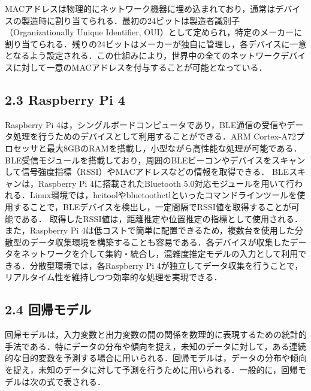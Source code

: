 MACアドレスは物理的にネットワーク機器に埋め込まれており，通常はデバイスの製造時に割り当てられる．最初の24ビットは製造者識別子（Organizationally Unique Identifier, OUI）として定められ，特定のメーカーに割り当てられる．残りの24ビットはメーカーが独自に管理し，各デバイスに一意となるよう設定される．この仕組みにより，世界中の全てのネットワークデバイスに対して一意のMACアドレスを付与することが可能となっている．

\subsection*{2.3 Raspberry Pi 4}
Raspberry Pi 4は，シングルボードコンピュータであり，BLE通信の受信やデータ処理を行うためのデバイスとして利用することができる\cite{rasPi}．ARM Cortex-A72プロセッサと最大8GBのRAMを搭載し，小型ながら高性能な処理が可能である\cite{rasPi}．BLE受信モジュールを搭載しており，周囲のBLEビーコンやデバイスをスキャンして信号強度指標（RSSI）やMACアドレスなどの情報を取得できる\cite{rasPi}．
BLEスキャンは，Raspberry Pi 4に搭載されたBluetooth 5.0対応モジュールを用いて行われる．Linux環境では，hcitoolやbluetoothctlといったコマンドラインツールを使用することで，BLEデバイスを検出し，一定間隔でRSSI値を取得することが可能である．
取得したRSSI値は，距離推定や位置推定の指標として使用される．
また，Raspberry Pi 4は低コストで簡単に配置できるため，複数台を使用した分散型のデータ収集環境を構築することも容易である．各デバイスが収集したデータをネットワークを介して集約・統合し，混雑度推定モデルの入力として利用できる．分散型環境では，各Raspberry Pi 4が独立してデータ収集を行うことで，リアルタイム性を維持しつつ効率的な処理を実現できる．

\subsection*{2.4 回帰モデル}
回帰モデルは，入力変数と出力変数の間の関係を数理的に表現するための統計的手法である\cite{prml}．特にデータの分布や傾向を捉え，未知のデータに対して，ある連続的な目的変数を予測する場合に用いられる．回帰モデルは，データの分布や傾向を捉え，未知のデータに対して予測を行うために用いられる．一般的に，回帰モデルは次の式で表される．

